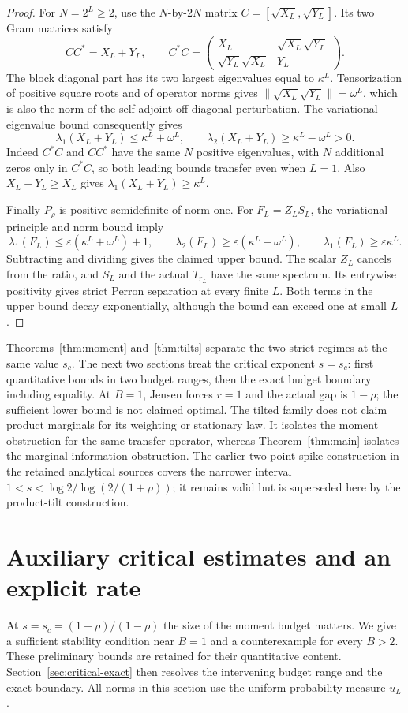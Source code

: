 \documentclass[11pt]{article}
\begin{document}
\begin{proof}
For $N=2^L\ge2$, use the $N$-by-$2N$ matrix
$C=[\sqrt{X_L},\sqrt{Y_L}]$. Its two Gram matrices satisfy
\[
 CC^*=X_L+Y_L,\qquad
 C^*C=\begin{pmatrix}
 X_L&\sqrt{X_L}\sqrt{Y_L}\\
 \sqrt{Y_L}\sqrt{X_L}&Y_L
 \end{pmatrix}.
\]
The block diagonal part has its two largest eigenvalues equal to
$\kappa^L$. Tensorization of positive square roots and of operator
norms gives $\|\sqrt{X_L}\sqrt{Y_L}\|=\omega^L$, which is also the
norm of the self-adjoint off-diagonal perturbation. The variational
eigenvalue bound consequently gives
\[
 \lambda_1(X_L+Y_L)\le\kappa^L+\omega^L,\qquad
 \lambda_2(X_L+Y_L)\ge\kappa^L-\omega^L>0.
\]
Indeed $C^*C$ and $CC^*$ have the same $N$ positive eigenvalues,
with $N$ additional zeros only in $C^*C$, so both leading bounds
transfer even when $L=1$. Also $X_L+Y_L\ge X_L$ gives
$\lambda_1(X_L+Y_L)\ge\kappa^L$.

Finally $P_\rho$ is positive semidefinite of norm one. For
$F_L=Z_L S_L$, the variational principle and norm bound imply
\[
 \lambda_1(F_L)\le\varepsilon(\kappa^L+\omega^L)+1,
 \qquad \lambda_2(F_L)\ge\varepsilon(\kappa^L-\omega^L),
 \qquad \lambda_1(F_L)\ge\varepsilon\kappa^L.
\]
Subtracting and dividing gives the claimed upper bound. The scalar
$Z_L$ cancels from the ratio, and $S_L$ and the actual $T_{r_L}$
have the same spectrum. Its entrywise positivity gives strict Perron
separation at every finite $L$. Both terms in the upper bound decay
exponentially, although the bound can exceed one at small $L$.
\end{proof}

Theorems~\ref{thm:moment} and~\ref{thm:tilts} separate the two strict
regimes at the same value $s_c$. The next two sections treat the critical exponent $s=s_c$:
first quantitative bounds in two budget ranges, then the exact budget
boundary including equality. At $B=1$, Jensen forces $r=1$ and the actual gap is $1-\rho$;
the sufficient lower bound is not claimed optimal. The tilted family
does not claim product marginals for its weighting or stationary law.
It isolates the moment obstruction for the same transfer operator,
whereas Theorem~\ref{thm:main} isolates the marginal-information
obstruction. The earlier two-point-spike construction in the retained
analytical sources covers the narrower interval
$1<s<\log2/\log(2/(1+\rho))$; it remains valid but is superseded here
by the product-tilt construction.


\section{Auxiliary critical estimates and an explicit rate}
At $s=s_c=(1+\rho)/(1-\rho)$ the size of the moment budget matters.
We give a sufficient stability condition near $B=1$ and a counterexample
for every $B>2$. These preliminary bounds are retained for their quantitative content.
Section~\ref{sec:critical-exact} then resolves the intervening budget
range and the exact boundary. All norms in this section use the uniform
probability measure $u_L$.
\end{document}
